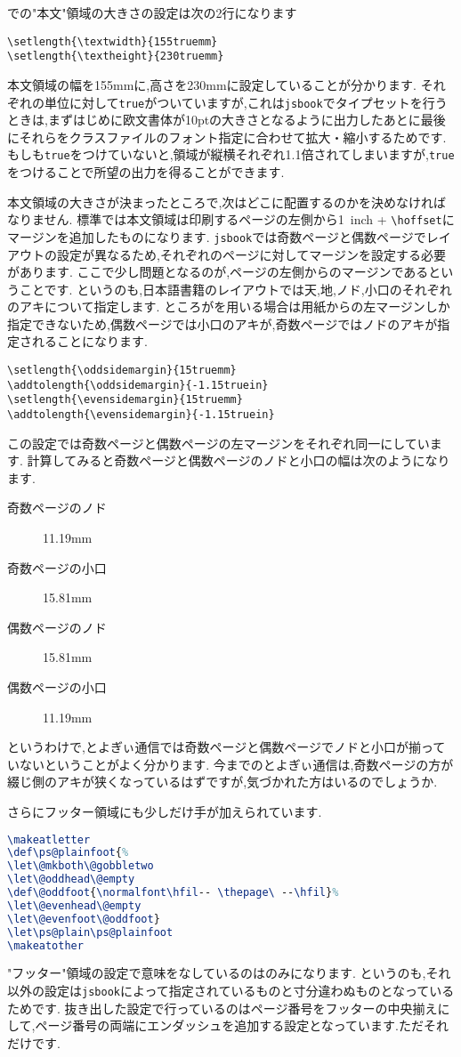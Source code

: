 での"本文"領域の大きさの設定は次の2行になります
\begin{verbatim}
\setlength{\textwidth}{155truemm}
\setlength{\textheight}{230truemm}
\end{verbatim}
本文領域の幅を155mmに,高さを230mmに設定していることが分かります.
それぞれの単位に対して\texttt{true}がついていますが,これは\texttt{jsbook}でタイプセットを行うときは,まずはじめに欧文書体が10ptの大きさとなるように出力したあとに最後にそれらをクラスファイルのフォント指定に合わせて拡大・縮小するためです.
もしも\texttt{true}をつけていないと,領域が縦横それぞれ1.1倍されてしまいますが,\texttt{true}をつけることで所望の出力を得ることができます.

本文領域の大きさが決まったところで,次はどこに配置するのかを決めなければなりません.
標準では本文領域は印刷するページの左側から1\ inch + \verb|\|\texttt{hoffset}にマージンを追加したものになります.
\texttt{jsbook}では奇数ページと偶数ページでレイアウトの設定が異なるため,それぞれのページに対してマージンを設定する必要があります.
ここで少し問題となるのが,ページの左側からのマージンであるということです.
というのも,日本語書籍のレイアウトでは天,地,ノド,小口のそれぞれのアキについて指定します.
ところが{\pLaTeX}を用いる場合は用紙からの左マージンしか指定できないため,偶数ページでは小口のアキが,奇数ページではノドのアキが指定されることになります.
\begin{verbatim}
\setlength{\oddsidemargin}{15truemm}
\addtolength{\oddsidemargin}{-1.15truein}
\setlength{\evensidemargin}{15truemm}
\addtolength{\evensidemargin}{-1.15truein}
\end{verbatim}
この設定では奇数ページと偶数ページの左マージンをそれぞれ同一にしています.
計算してみると奇数ページと偶数ページのノドと小口の幅は次のようになります.
\begin{description}
	\item[奇数ページのノド] 11.19mm
	\item[奇数ページの小口] 15.81mm
	\item[偶数ページのノド] 15.81mm
	\item[偶数ページの小口] 11.19mm
\end{description}
というわけで,とよぎぃ通信では奇数ページと偶数ページでノドと小口が揃っていないということがよく分かります.
今までのとよぎぃ通信は,奇数ページの方が綴じ側のアキが狭くなっているはずですが,気づかれた方はいるのでしょうか.

さらにフッター領域にも少しだけ手が加えられています.
\begin{lstlisting}[caption = "フッター"領域の設定, label = list:footer, language=tex]
\makeatletter
\def\ps@plainfoot{%
\let\@mkboth\@gobbletwo
\let\@oddhead\@empty
\def\@oddfoot{\normalfont\hfil-- \thepage\ --\hfil}%
\let\@evenhead\@empty
\let\@evenfoot\@oddfoot}
\let\ps@plain\ps@plainfoot
\makeatother
\end{lstlisting}
"フッター"領域の設定で意味をなしているのは\texttt{\def\@oddfoot{\normalfont\hfil-- \thepage\ --\hfil}}のみになります.
というのも,それ以外の設定は\texttt{jsbook}によって指定されているものと寸分違わぬものとなっているためです.
抜き出した設定で行っているのはページ番号をフッターの中央揃えにして,ページ番号の両端にエンダッシュを追加する設定となっています.ただそれだけです.

